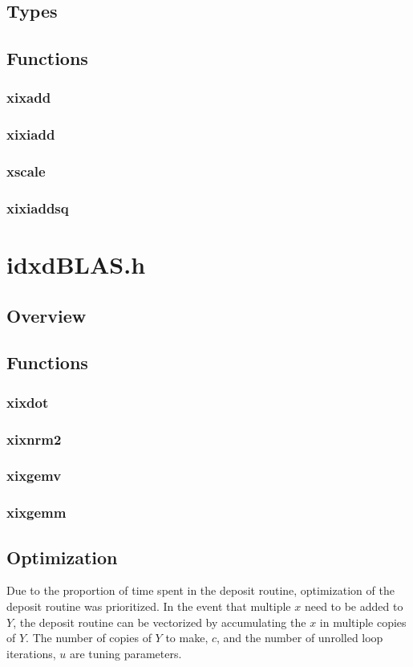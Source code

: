 \documentclass[12pt]{article}
\theoremstyle{plain}
\numberwithin{equation}{section}
\begin{document}
  \subsection{Types}
  \subsection{Functions}
    \subsubsection{xixadd}
    \subsubsection{xixiadd}
    \subsubsection{xscale}
    \subsubsection{xixiaddsq}
\section{idxdBLAS.h}
  \subsection{Overview}
  \subsection{Functions}
    \subsubsection{xixdot}
    \subsubsection{xixnrm2}
    \subsubsection{xixgemv}
    \subsubsection{xixgemm}
  \subsection{Optimization}
    Due to the proportion of time spent in the deposit routine, optimization of the deposit routine was prioritized. In the event that multiple $x$ need to be added to $Y$, the deposit routine can be vectorized by accumulating the $x$ in multiple copies of $Y$. The number of copies of $Y$ to make, $c$, and the number of unrolled loop iterations, $u$ are tuning parameters.
\end{document}
